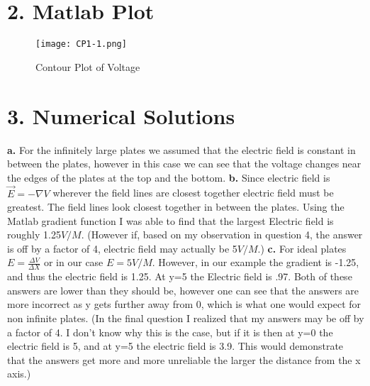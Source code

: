 \documentclass[english]{article}
\begin{document}
\begin{flushleft}
\section*{2. Matlab Plot}
\begin{figure}[H]
\begin{center}
\texttt{[image: CP1-1.png]}
\caption{Contour Plot of Voltage}
\end{center}
\end{figure}
\section*{3. Numerical Solutions}
\textbf{a.} For the infinitely large plates we assumed that the electric field is constant in between the plates, however in this case we can see that the voltage changes near the edges of the plates at the top and the bottom.
\linebreak
\textbf{b.} Since electric field is $\vec{E}=-\nabla V$ wherever the field lines are closest together electric field must be greatest. The field lines look closest together in between the plates. Using the Matlab gradient function I was able to find that the largest Electric field is roughly 1.25$V/M$. (However if, based on my observation in question 4, the answer is off by a factor of 4, electric field may actually be 5$V/M$.)
\linebreak
\textbf{c.} For ideal plates $E=\frac{\Delta V}{\Delta X}$ or in our case $E=5V/M$. However, in our example the gradient is -1.25, and thus the electric field is 1.25. At y=5 the Electric field is .97. Both of these answers are lower than they should be, however one can see that the answers are more incorrect as y gets further away from 0, which is what one would expect for non infinite plates. (In the final question I realized that my answers may be off by a factor of 4. I don't know why this is the case, but if it is then at y=0 the electric field is 5, and at y=5 the electric field is 3.9. This would demonstrate that the answers get more and more unreliable the larger the distance from the x axis.)


\end{flushleft}
\end{document}
